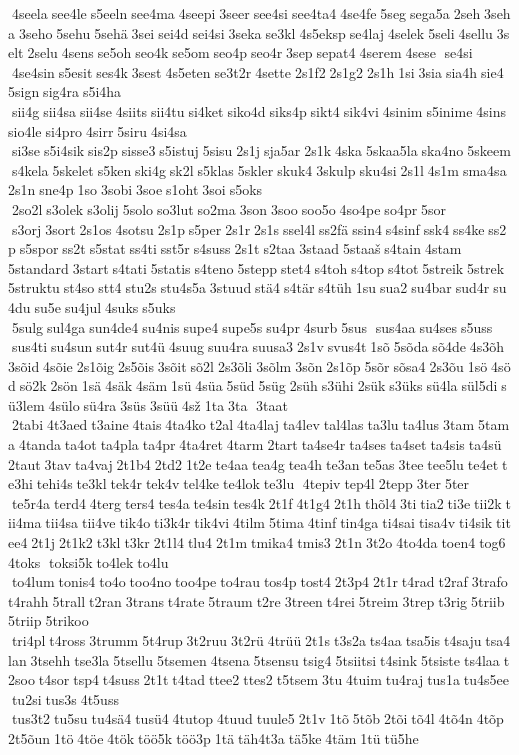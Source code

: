  4seela see4le s5eeln see4ma 4seepi 3seer see4si see4ta4 4se4fe 5seg sega5a 2seh 3seha 3seho 5sehu 5sehä 3sei sei4d sei4si 3seka se3kl 4s5eksp se4laj 4selek 5seli 4sellu 3selt 2selu 4sens se5oh seo4k se5om seo4p seo4r 3sep sepat4 4serem 4sese  se4si  4se4sin s5esit ses4k 3sest 4s5eten se3t2r 4sette 2s1f2 2s1g2 2s1h 1si 3sia sia4h sie4 5sign sig4ra s5i4ha  sii4g sii4sa sii4se 4siits sii4tu si4ket siko4d siks4p sikt4 sik4vi 4sinim s5inime 4sins sio4le si4pro 4sirr 5siru 4si4sa  si3se s5i4sik sis2p sisse3 s5istuj 5sisu 2s1j sja5ar 2s1k 4ska 5skaa5la ska4no 5skeem  s4kela 5skelet s5ken ski4g sk2l s5klas 5skler skuk4 3skulp sku4si 2s1l 4s1m sma4sa 2s1n sne4p 1so 3sobi 3soe s1oht 3soi s5oks  2so2l s3olek s3olij 5solo so3lut so2ma 3son 3soo soo5o 4so4pe so4pr 5sor  s3orj 3sort 2s1os 4sotsu 2s1p s5per 2s1r 2s1s ssel4l ss2fä ssin4 s4sinf ssk4 ss4ke ss2p s5spor ss2t s5stat ss4ti sst5r s4suss 2s1t s2taa 3staad 5staaš s4tain 4stam 	5standard 3start s4tati 5statis s4teno 5stepp stet4 s4toh s4top s4tot 5streik 5strek 5struktu st4so stt4 stu2s stu4s5a 3stuud stä4 s4tär s4tüh 1su sua2 su4bar sud4r su4du su5e su4jul 4suks s5uks  5sulg sul4ga sun4de4 su4nis supe4 supe5s su4pr 4surb 5sus  sus4aa su4ses s5uss  sus4ti su4sun sut4r sut4ü 4suug suu4ra suusa3 2s1v svus4t 1sõ 5sõda sõ4de 4s3õh 3sõid 4sõie 2s1õig 2s5õis 3sõit sõ2l 2s3õli 3sõlm 3sõn 2s1õp 5sõr sõsa4 2s3õu 1sö 4söd sö2k 2sön 1sä 4säk 4säm 1sü 4süa 5süd 5süg 2süh s3ühi 2sük s3üks sü4la sül5di sü3lem 4sülo sü4ra 3süs 3süü 4sž 1ta 3ta  3taat  2tabi 4t3aed t3aine 4tais 4ta4ko t2al 4ta4laj ta4lev tal4las ta3lu ta4lus 3tam 5tama 4tanda ta4ot ta4pla ta4pr 4ta4ret 4tarm 2tart ta4se4r ta4ses ta4set ta4sis ta4sü 2taut 3tav ta4vaj 2t1b4 2td2 1t2e te4aa tea4g tea4h te3an te5as 3tee tee5lu te4et te3hi tehi4s te3kl tek4r tek4v tel4ke te4lok te3lu  4tepiv tep4l 2tepp 3ter 5ter  te5r4a terd4 4terg ters4 tes4a te4sin tes4k 2t1f 4t1g4 2t1h thõl4 3ti tia2 ti3e tii2k tii4ma tii4sa tii4ve tik4o ti3k4r tik4vi 4tilm 5tima 4tinf tin4ga ti4sai tisa4v ti4sik titee4 2t1j 2t1k2 t3kl t3kr 2t1l4 tlu4 2t1m tmika4 tmis3 2t1n 3t2o 4to4da toen4 tog6 4toks  toksi5k to4lek to4lu  to4lum tonis4 to4o too4no too4pe to4rau tos4p tost4 2t3p4 2t1r t4rad t2raf 3trafo t4rahh 5trall t2ran 3trans t4rate 5traum t2re 3treen t4rei 5treim 3trep t3rig 5triib 5triip 5trikoo  tri4pl t4ross 3trumm 5t4rup 3t2ruu 3t2rü 4trüü 2t1s t3s2a ts4aa tsa5is t4saju tsa4lan 3tsehh tse3la 5tsellu 5tsemen 4tsena 5tsensu tsig4 5tsiitsi t4sink 5tsiste ts4laa t2soo t4sor tsp4 t4suss 2t1t t4tad ttee2 ttes2 t5tsem 3tu 4tuim tu4raj tus1a tu4s5ee tu2si tus3s 4t5uss  tus3t2 tu5su tu4sä4 tusü4 4tutop 4tuud tuule5 2t1v 1tõ 5tõb 2tõi tõ4l 4tõ4n 4tõp 2t5õun 1tö 4töe 4tök töö5k töö3p 1tä täh4t3a tä5ke 4täm 1tü tü5he 